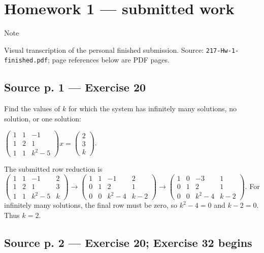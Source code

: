 \section{Homework 1 --- submitted work}

\begin{qlnote}{Note}

Visual transcription of the personal finished submission. Source: \texttt{217-Hw-1-finished.pdf}; page references below are PDF pages.

\end{qlnote}

\subsection{Source p. 1 --- Exercise 20}

Find the values of \(k\) for which the system has infinitely many solutions, no solution, or one solution:

\(\begin{pmatrix}
1 & 1 & {- 1} \\
1 & 2 & 1 \\
1 & 1 & {k^{2} - 5}
\end{pmatrix}x = \begin{pmatrix}
2 \\
3 \\
k
\end{pmatrix}\).

The submitted row reduction is \(\begin{pmatrix}
1 & 1 & {- 1} & 2 \\
1 & 2 & 1 & 3 \\
1 & 1 & {k^{2} - 5} & k
\end{pmatrix}\rightarrow\begin{pmatrix}
1 & 1 & {- 1} & 2 \\
0 & 1 & 2 & 1 \\
0 & 0 & {k^{2} - 4} & {k - 2}
\end{pmatrix}\rightarrow\begin{pmatrix}
1 & 0 & {- 3} & 1 \\
0 & 1 & 2 & 1 \\
0 & 0 & {k^{2} - 4} & {k - 2}
\end{pmatrix}\). For infinitely many solutions, the final row must be zero, so \(k^{2} - 4 = 0\) and \(k - 2 = 0\). Thus \(k = 2\).

\subsection{Source p. 2 --- Exercise 20; Exercise 32 begins}

